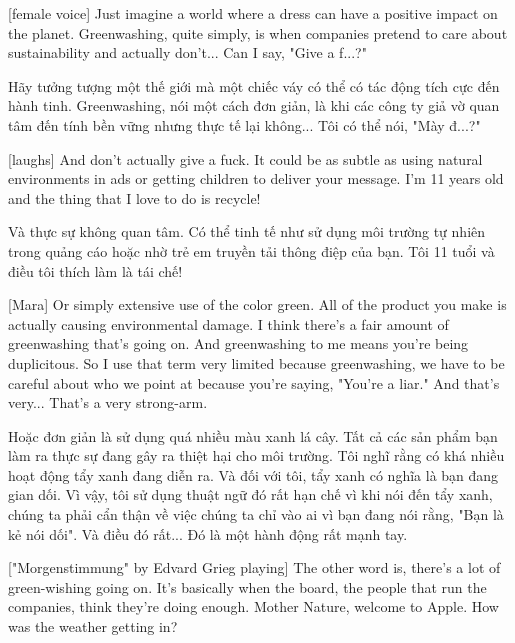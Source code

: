 \documentclass[a4paper]{article}
\begin{document}
	[female voice] Just imagine a world where a dress can have a positive impact on the planet.
	Greenwashing, quite simply, is when companies pretend to care about sustainability and actually don't... Can I say, "Give a f...?"
	
	\begin{vietnamese-v2}
		[giọng nữ] Hãy tưởng tượng một thế giới mà một chiếc váy có thể có tác động tích cực đến hành tinh.
		Greenwashing, nói một cách đơn giản, là khi các công ty giả vờ quan tâm đến tính bền vững nhưng thực tế lại không... Tôi có thể nói, "Mày đ...?"
	\end{vietnamese-v2}
	
	[laughs]
	And don't actually give a fuck.
	It could be as subtle as using natural environments in ads or getting children to deliver your message.
	I'm 11 years old and the thing that I love to do is recycle!

	\begin{vietnamese-v2}
		[cười]
		Và thực sự không quan tâm.
		Có thể tinh tế như sử dụng môi trường tự nhiên trong quảng cáo hoặc nhờ trẻ em truyền tải thông điệp của bạn.
		Tôi 11 tuổi và điều tôi thích làm là tái chế!
	\end{vietnamese-v2}

	[Mara] Or simply extensive use of the color green.
	All of the product you make is actually causing environmental damage.
	I think there's a fair amount of greenwashing that's going on.
	And greenwashing to me means you're being duplicitous.
	So I use that term very limited	because greenwashing, we have to be careful about who we point at because you're saying, "You're a liar."
	And that's very... That's a very strong-arm.
	
	\begin{vietnamese-v2}
		[Mara] Hoặc đơn giản là sử dụng quá nhiều màu xanh lá cây.
		Tất cả các sản phẩm bạn làm ra thực sự đang gây ra thiệt hại cho môi trường.
		Tôi nghĩ rằng có khá nhiều hoạt động tẩy xanh đang diễn ra.
		Và đối với tôi, tẩy xanh có nghĩa là bạn đang gian dối.
		Vì vậy, tôi sử dụng thuật ngữ đó rất hạn chế vì khi nói đến tẩy xanh, chúng ta phải cẩn thận về việc chúng ta chỉ vào ai vì bạn đang nói rằng, "Bạn là kẻ nói dối".
		Và điều đó rất... Đó là một hành động rất mạnh tay.
	\end{vietnamese-v2}
	
	["Morgenstimmung" by Edvard Grieg playing]
	The other word is, there's a lot of green-wishing going on.
	It's basically when the board, the people that run the companies, think they're doing enough.
	Mother Nature, welcome to Apple.
	How was the weather getting in?
	
\end{document}
